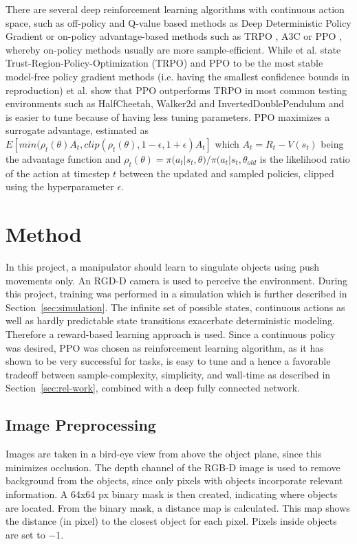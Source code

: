 \documentclass{article}
\newcommand{\mysecref}[1]{Section~\ref{#1}}
\begin{document}
There are several deep reinforcement learning algorithms with continuous action space, such as off-policy and Q-value based methods as Deep Deterministic Policy Gradient \cite{ddpg} or on-policy advantage-based methods such as TRPO \cite{trpo}, A3C \cite{a3c} or PPO \cite{ppo}, whereby on-policy methods usually are more sample-efficient. While \citeauthor{drlthatmatters} et al. \cite{drlthatmatters} state Trust-Region-Policy-Optimization (TRPO) and PPO to be the most stable model-free policy gradient methods (i.e. having the smallest confidence bounds in reproduction) \citeauthor{baselines} et al. \cite{baselines} show that PPO outperforms TRPO in most common testing environments such as HalfCheetah, Walker2d and InvertedDoublePendulum and is easier to tune because of having less tuning parameters. PPO maximizes a surrogate advantage, estimated as $E[min(\rho_t(\theta) A_t, clip(\rho_t(\theta), 1 - \epsilon, 1 + \epsilon)A_t]$ which $A_t = R_t - V(s_t)$ being the advantage function and $\rho_t(\theta) = \pi(a_t | s_t, \theta) / \pi(a_t | s_t, \theta_{old}$ is the likelihood ratio of the action at timestep $t$ between the updated and sampled policies, clipped using the  hyperparameter $\epsilon$. 


\section{Method}
\label{sec:method}
In this project, a manipulator should learn to singulate objects using push movements only.  An RGD-D camera is used to perceive the environment. During this project, training was performed in a simulation which is further described in \mysecref{sec:simulation}. The infinite set of possible states, continuous actions as well as hardly predictable state transitions exacerbate deterministic modeling. Therefore a reward-based learning approach is used. Since a continuous policy was desired, PPO \citep{ppo} was chosen as reinforcement learning algorithm, as it has shown to be very successful for tasks, is easy to tune and a hence a favorable tradeoff between sample-complexity, simplicity, and wall-time as described in \mysecref{sec:rel-work}, combined with a deep fully connected network.

\subsection{Image Preprocessing}
\label{images}
Images are taken in a bird-eye view from above the object plane, since this minimizes occlusion. The depth channel of the RGB-D image is used to remove background from the objects, since only pixels with objects incorporate relevant information.
A 64x64 px binary mask is then created, indicating where objects are located. From the binary mask, a distance map is calculated. This map shows the distance (in pixel) to the closest object for each pixel. Pixels inside objects are set to $-1$. 
\end{document}
